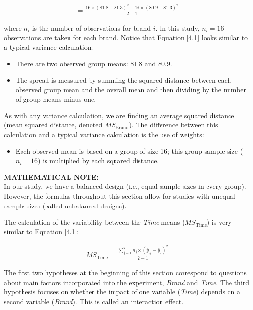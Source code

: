 \documentclass[
]{report}
\providecommand{\tightlist}{%
  \setlength{\itemsep}{0pt}\setlength{\parskip}{0pt}}
\begin{document}
\begin{align}\label{4.1}
= \frac{16 \times (81.8 - 81.3)^2 + 16 \times (80.9 - 81.3)^2}{2-1}
\tag{4.1}
\end{align}

where \(n_i\) is the number of observations for brand \(i\). In this study, \(n_i = 16\) observations are taken for each brand. Notice that Equation \ref{4.1} looks similar to a typical variance calculation:

\begin{itemize}
\tightlist
\item
  There are two observed group means: 81.8 and 80.9.
\item
  The spread is measured by summing the squared distance between each observed group mean and the overall mean and then dividing by the number of group means minus one.
\end{itemize}

As with any variance calculation, we are finding an average squared distance (mean squared distance, denoted \(MS_{\text{Brand}}\)). The difference between this calculation and a typical variance calculation is the use of weights:

\begin{itemize}
\tightlist
\item
  Each observed mean is based on a group of size 16; this group sample size (\(n_i = 16\)) is multiplied by each squared distance.
\end{itemize}

\large

\textbf{MATHEMATICAL NOTE:}\\
In our study, we have a balanced design (i.e., equal sample sizes in every group). However, the formulas throughout this section allow for studies with unequal sample sizes (called unbalanced designs).
\normalsize

The calculation of the variability between the \emph{Time} means (\(MS_{\text{Time}}\)) is very similar to Equation \ref{4.1}:

\begin{align}\label{4.2}
MS_{\text{Time}} = \frac{\sum_{j=1}^{2} n_j \times (\bar{y}_{.j} - \bar{y}_{..})^2}{2-1}
\tag{4.2}
\end{align}

The first two hypotheses at the beginning of this section correspond to questions about main factors incorporated into the experiment, \emph{Brand} and \emph{Time}. The third hypothesis focuses on whether the impact of one variable (\emph{Time}) depends on a second variable (\emph{Brand}). This is called an interaction effect.
\end{document}
